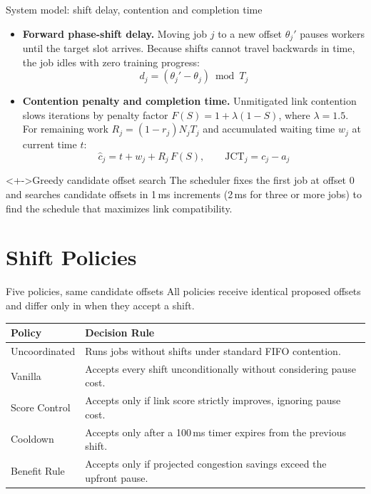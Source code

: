 \documentclass[aspectratio=169,11pt,c]{beamer}
\begin{document}
\begin{frame}{System model: shift delay, contention and completion time}
  \footnotesize
  \setlength{\abovedisplayskip}{3pt}
  \setlength{\belowdisplayskip}{3pt}
  \begin{itemize}[<+->]
    \item \textbf{Forward phase-shift delay.} Moving job $j$ to a new offset $\theta_j'$ pauses workers until the target slot arrives. Because shifts cannot travel backwards in time, the job idles with zero training progress:
    \[ d_j = (\theta_j' - \theta_j) \bmod T_j \]

    \item \textbf{Contention penalty and completion time.} Unmitigated link contention slows iterations by penalty factor $F(S) = 1 + \lambda(1 - S)$, where $\lambda = 1.5$. For remaining work $R_j = (1 - r_j)N_jT_j$ and accumulated waiting time $w_j$ at current time $t$:
    \[ \hat c_j = t + w_j + R_j\,F(S), \qquad \mathrm{JCT}_j = c_j - a_j \]
  \end{itemize}
  \vspace{-0.3em}
  \begin{block}<+->{Greedy candidate offset search}
    \scriptsize The scheduler fixes the first job at offset 0 and searches candidate offsets in 1\,ms increments (2\,ms for three or more jobs) to find the schedule that maximizes link compatibility.
  \end{block}
\end{frame}

\section{Shift Policies}

\begin{frame}{Five policies, same candidate offsets}
  All policies receive identical proposed offsets and differ only in when they accept a shift.
  \vspace{0.6em}

  \small
  \begin{tabular}{@{}lp{}@{}}
    \toprule
    \textbf{Policy} & \textbf{Decision Rule} \\
    \midrule
    Uncoordinated & Runs jobs without shifts under standard FIFO contention. \\
    Vanilla & Accepts every shift unconditionally without considering pause cost. \\
    Score Control & Accepts only if link score strictly improves, ignoring pause cost. \\
    Cooldown & Accepts only after a 100\,ms timer expires from the previous shift. \\
    \alert{Benefit Rule} & Accepts only if projected congestion savings exceed the upfront pause. \\
    \bottomrule
  \end{tabular}
\end{frame}
\end{document}
